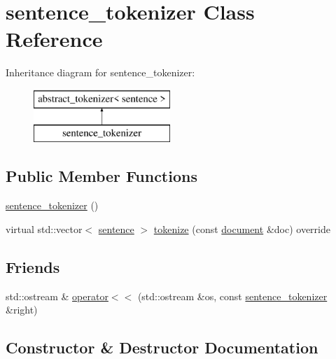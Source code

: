 \hypertarget{classsentence__tokenizer}{}\section{sentence\+\_\+tokenizer Class Reference}
\label{classsentence__tokenizer}
Inheritance diagram for sentence\+\_\+tokenizer\+:\begin{figure}[H]
\begin{center}
\leavevmode
\includegraphics[height=2.000000cm]{classsentence__tokenizer}
\end{center}
\end{figure}
\subsection*{Public Member Functions}
\begin{DoxyCompactItemize}
\item 
\hyperlink{classsentence__tokenizer_aa36679bc4afb2788d5c81fcee4ab9e0b}{sentence\+\_\+tokenizer} ()
\item 
virtual std\+::vector$<$ \hyperlink{classsentence}{sentence} $>$ \hyperlink{classsentence__tokenizer_abd8fdaae180f7c8c6dea91c68f7b8865}{tokenize} (const \hyperlink{classdocument}{document} \&doc) override
\end{DoxyCompactItemize}
\subsection*{Friends}
\begin{DoxyCompactItemize}
\item 
std\+::ostream \& \hyperlink{classsentence__tokenizer_a117c39aafe92e99e106009e113640bc5}{operator$<$$<$} (std\+::ostream \&os, const \hyperlink{classsentence__tokenizer}{sentence\+\_\+tokenizer} \&right)
\end{DoxyCompactItemize}


\subsection{Constructor \& Destructor Documentation}
\mbox{\label{classsentence__tokenizer_aa36679bc4afb2788d5c81fcee4ab9e0b}} 
